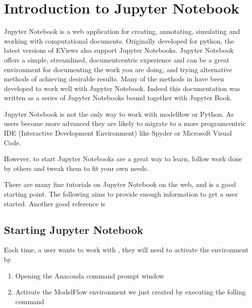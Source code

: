 \documentclass[letterpaper,10pt,english]{jupyterBook}
\begin{document}
\chapter{Introduction to  Jupyter Notebook}
\label{\detokenize{content/04_PythonEssentials/Intro_Jupyter_notebook:introduction-to-jupyter-notebook}}\label{\detokenize{content/04_PythonEssentials/Intro_Jupyter_notebook::doc}}
\sphinxAtStartPar
Jupyter Notebook is a web application for creating, annotating, simulating and working with computational documents.  Originally developed for python, the latest versions of EViews also support Jupyter Notebooks. Jupyter Notebook offers a simple, streamlined, document\sphinxhyphen{}centric experience and can be a great environment for documenting the work you are doing, and trying alternative methods of achieving desirable results.  Many of the methods in  have been developed to work well with Jupyter Notebook. Indeed this documentation was written as a series of Jupyter Notebooks bound together with Jupyter Book.

\sphinxAtStartPar
Jupyter Notebook is not the only way to work with modelflow or Python.  As users become more advanced they are likely to migrate to a more program\sphinxhyphen{}centric IDE (Interactive Development Environment) like Spyder or Microsoft Visual Code.

\sphinxAtStartPar
However, to start Jupyter Notebooks are a great way to learn, follow work done by others and tweak them to fit your own needs.

\sphinxAtStartPar
There are many fine tutorials on Jupyter Notebook on the web, and  is a good starting point. The following aims to provide enough information to get a user started.  Another good reference is 


\section{Starting Jupyter Notebook}
\label{\detokenize{content/04_PythonEssentials/Intro_Jupyter_notebook:starting-jupyter-notebook}}
\sphinxAtStartPar
Each time, a user wants to work with , they will need to activate the  environment by
\begin{enumerate}
%
\item {} 
\sphinxAtStartPar
Opening the Anaconda command prompt window

\item {} 
\sphinxAtStartPar
Activate the ModelFlow environment we just created by executing the folling command

\end{enumerate}
\end{document}
